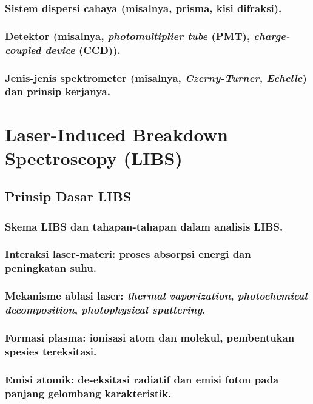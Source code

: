 \subsubsection{Sistem dispersi cahaya (misalnya, prisma, kisi difraksi).}
\subsubsection{Detektor (misalnya, \textit{photomultiplier tube} (PMT), \textit{charge-coupled device} (CCD)).}
\subsubsection{Jenis-jenis spektrometer (misalnya, \textit{Czerny-Turner}, \textit{Echelle}) dan prinsip kerjanya.}


\section{Laser-Induced Breakdown Spectroscopy (LIBS)}

\subsection{Prinsip Dasar LIBS}

\subsubsection{Skema LIBS dan tahapan-tahapan dalam analisis LIBS.}
\subsubsection{Interaksi laser-materi: proses absorpsi energi dan peningkatan suhu.}
\subsubsection{Mekanisme ablasi laser: \textit{thermal vaporization}, \textit{photochemical decomposition}, \textit{photophysical sputtering}.}
\subsubsection{Formasi plasma: ionisasi atom dan molekul, pembentukan spesies tereksitasi.}
\subsubsection{Emisi atomik: de-eksitasi radiatif dan emisi foton pada panjang gelombang karakteristik.}

